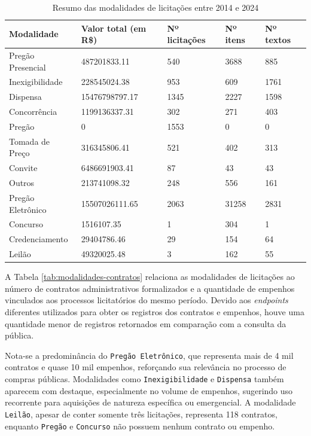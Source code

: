 \documentclass[
	12pt,				%
	oneside,			%
	a4paper,			%
	chapter=TITLE,		%
	section=TITLE,		%
	english,			%
	brazil				%
	]{abntex2}
\begin{document}
\begin{table}[h]
	\caption{Resumo das modalidades de licitações entre 2014 e 2024}
	\label{tab:modalidades-licitacoes}
	\center
	\begin{tabular}{|l|l|l|l|l|}
		\hline
		\textbf{Modalidade} & \textbf{Valor total (em R\$)} & \textbf{Nº licitações} & \textbf{Nº itens} & \textbf{Nº textos} \\ \hline
		Pregão Presencial & 487201833.11 & 540 & 3688 & 885 \\ \hline
		Inexigibilidade & 228545024.38 & 953 & 609 & 1761 \\ \hline
		Dispensa & 15476798797.17 & 1345 & 2227 & 1598 \\ \hline
		Concorrência & 1199136337.31 & 302 & 271 & 403 \\ \hline
		Pregão & 0 & 1553 & 0 & 0 \\ \hline
		Tomada de Preço & 316345806.41 & 521 & 402 & 313 \\ \hline
		Convite & 6486691903.41 & 87 & 43 & 43 \\ \hline
		Outros & 213741098.32 & 248 & 556 & 161 \\ \hline
		Pregão Eletrônico & 15507026111.65 & 2063 & 31258 & 2831 \\ \hline
		Concurso & 1516107.35 & 1 & 304 & 1 \\ \hline
		Credenciamento & 29404786.46 & 29 & 154 & 64 \\ \hline
		Leilão & 49320025.48 & 3 & 162 & 55 \\ \hline
	\end{tabular}
\end{table}

A Tabela \ref{tab:modalidades-contratos} relaciona as modalidades de licitações ao número de contratos administrativos formalizados e a quantidade de empenhos vinculados aos processos licitatórios do mesmo período. Devido aos \textit{endpoints} diferentes utilizados para obter os registros dos contratos e empenhos, houve uma quantidade menor de registros retornados em comparação com a consulta da  pública.

Nota-se a predominância do \texttt{Pregão Eletrônico}, que representa mais de 4 mil contratos e quase 10 mil empenhos, reforçando sua relevância no processo de compras públicas. Modalidades como \texttt{Inexigibilidade} e \texttt{Dispensa} também aparecem com destaque, especialmente no volume de empenhos, sugerindo uso recorrente para aquisições de natureza específica ou emergencial. A modalidade \texttt{Leilão}, apesar de conter somente três licitações, representa 118 contratos, enquanto \texttt{Pregão} e \texttt{Concurso} não possuem nenhum contrato ou empenho.
\end{document}
